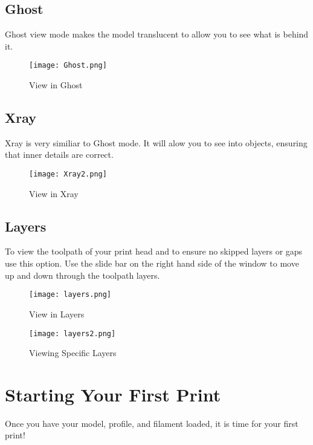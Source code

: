 \subsection{Ghost}
Ghost view mode makes the model translucent to allow you to see what is behind it.
\begin{figure}[H]
\centering
\texttt{[image: Ghost.png]}
\caption{View in Ghost}
\label{fig:Ghost View}
\end{figure}

\subsection{Xray}
Xray is very similiar to Ghost mode. It will alow you to see into objects, ensuring that inner details are correct.
\begin{figure}[H]
\centering
\texttt{[image: Xray2.png]}
\caption{View in Xray}
\label{fig:Xray View}
\end{figure}

\subsection{Layers}
To view the toolpath of your print head and to ensure no skipped layers or gaps use this option. Use the slide bar on the right hand side of the window to move up and down through the toolpath layers.
\begin{figure}[H]
\centering
\texttt{[image: layers.png]}
\caption{View in Layers}
\label{fig:Layers View}
\end{figure}

\begin{figure}[H]
\centering
\texttt{[image: layers2.png]}
\caption{Viewing Specific Layers}
\label{fig:Mid Layers View}
\end{figure}

\section{Starting Your First Print}
Once you have your model, profile, and filament loaded, it is time for your first print! 

